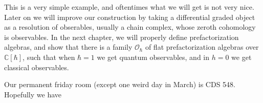 This is a very simple example, and oftentimes what we will get is not very nice. Later on we will improve our construction by taking a differential graded object as a resolution of obserables, usually a chain complex, whose zeroth cohomology is observables. In the next chapter, we will properly define prefactorization algebras, and show that there is a family $\mathcal{O} _\hbar $ of flat prefactorization algebras over $\mathbb{C} [\hbar ]$, such that when $\hbar =1$ we get quantum observables, and in $h=0$ we get classical observables.

Our permanent friday room (except one weird day in March) is CDS 548. Hopefully we have 
